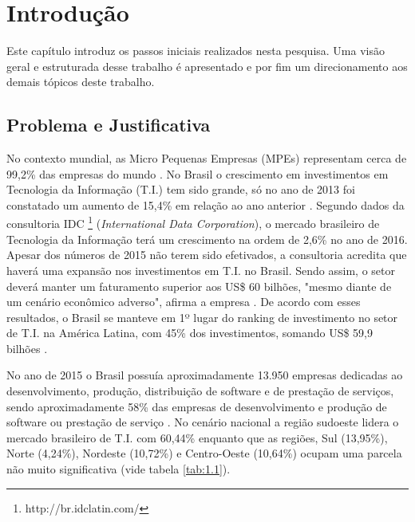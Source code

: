 \chapter{Introdução}
\label{cap:intro}

Este capítulo introduz os passos iniciais realizados nesta pesquisa. Uma visão geral e estruturada desse trabalho é apresentado e por fim um direcionamento aos demais tópicos deste trabalho.

\section{Problema e Justificativa}
\label{cap:problema}

No contexto mundial, as Micro Pequenas Empresas (MPEs) representam cerca de 99,2\% das empresas do mundo \cite{Laporte2010, Ramachandram2008}. No Brasil o crescimento em investimentos em Tecnologia da Informação (T.I.) tem sido grande, só no ano de 2013 foi constatado um aumento de 15,4\% em relação ao ano anterior \cite{SilvaDias2015}. Segundo dados da consultoria IDC \footnote{http://br.idclatin.com/} (\textit{International Data Corporation}), o mercado brasileiro de Tecnologia da Informação terá um crescimento na ordem de 2,6\% no ano de 2016. Apesar dos números de 2015 não terem sido efetivados, a consultoria acredita que haverá uma expansão nos investimentos em T.I. no Brasil. Sendo assim, o setor deverá manter um faturamento superior aos US\$ 60 bilhões, "mesmo diante de um cenário econômico adverso", afirma a empresa \cite{FelipeDreher2016}. De acordo com esses resultados, o Brasil se manteve em 1º lugar do ranking de investimento no setor de T.I. na América Latina, com 45\% dos investimentos, somando US\$ 59,9 bilhões \cite{FelipeDreher2016}.

No ano de 2015 o Brasil possuía aproximadamente 13.950 empresas dedicadas ao desenvolvimento, produção, distribuição de software e de prestação de serviços, sendo aproximadamente 58\% das empresas de desenvolvimento e produção de software ou prestação de serviço \cite{abranet2016}. No cenário nacional a região sudoeste lidera o mercado brasileiro de T.I. com 60,44\% enquanto que as regiões, Sul (13,95\%), Norte (4,24\%), Nordeste (10,72\%) e Centro-Oeste (10,64\%) ocupam uma parcela não muito significativa (vide tabela \ref{tab:1.1}).

